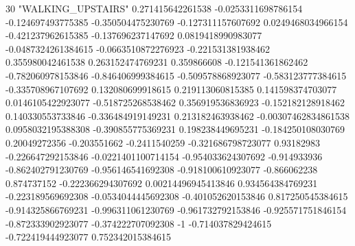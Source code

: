 30 "WALKING_UPSTAIRS" 0.271415642261538 -0.0253311698786154 -0.124697493775385 -0.350504475230769 -0.127311157607692 0.0249468034966154 -0.421237962615385 -0.137696237147692 0.0819418990983077 -0.0487324261384615 -0.0663510872276923 -0.221531381938462 0.355980042461538 0.263152474769231 0.359866608 -0.121541361862462 -0.782060978153846 -0.846406999384615 -0.509578868923077 -0.583123777384615 -0.335708967107692 0.132080699918615 0.219113060815385 0.141598374703077 0.0146105422923077 -0.518725268538462 0.356919536836923 -0.152182128918462 0.140330553733846 -0.336484919149231 0.213182463938462 -0.00307462834861538 0.0958032195388308 -0.390855775369231 0.198238449695231 -0.184250108030769 0.20049272356 -0.203551662 -0.2411540259 -0.321686798723077 0.93182983 -0.226647292153846 -0.0221401100714154 -0.954033624307692 -0.914933936 -0.862402791230769 -0.956146541692308 -0.918100610923077 -0.866062238 0.874737152 -0.222366294307692 0.00214496945413846 0.934564384769231 -0.223189569692308 -0.0534044445692308 -0.401052620153846 0.817250545384615 -0.914325866769231 -0.996311061230769 -0.961732792153846 -0.925571751846154 -0.872333902923077 -0.374222707092308 -1 -0.714037829424615 -0.722419444923077 0.752342015384615
